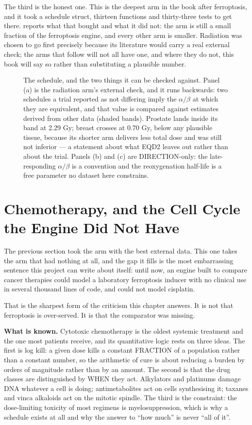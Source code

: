 \documentclass[11pt,twoside,openright]{report}
\begin{document}
The third is the honest one. This is the deepest arm in the book after ferroptosis, and it took a schedule struct, thirteen functions and thirty-three tests to get there.  reports what that bought and what it did not: the arm is still a small fraction of the ferroptosis engine, and every other arm is smaller. Radiation was chosen to go first precisely because its literature would carry a real external check; the arms that follow will not all have one, and where they do not, this book will say so rather than substituting a plausible number.

\begin{figure}[tbp]
\setcounter{figure}{31}
\caption{The schedule, and the two things it can be checked against. Panel (a) is the radiation arm's external check, and it runs backwards: two schedules a trial reported as not differing imply the $\alpha/\beta$ at which they are equivalent, and that value is compared against estimates derived from other data (shaded bands). Prostate lands inside its band at 2.29 Gy; breast crosses at 0.70 Gy, below any plausible tissue, because its shorter arm delivers less total dose and was still not inferior --- a statement about what EQD2 leaves out rather than about the trial. Panels (b) and (c) are DIRECTION-only: the late-responding $\alpha/\beta$ is a convention and the reoxygenation half-life is a free parameter no dataset here constrains.}
\label{fig:fig36_fractionation}
\end{figure}

\section{Chemotherapy, and the Cell Cycle the Engine Did Not Have}

The previous section took the arm with the best external data. This one takes the arm that had nothing at all, and the gap it fills is the most embarrassing sentence this project can write about itself: until now, an engine built to compare cancer therapies could model a laboratory ferroptosis inducer with no clinical use in several thousand lines of code, and could not model cisplatin.

That is the sharpest form of the criticism this chapter answers. It is not that ferroptosis is over-served. It is that the comparator was missing.

\textbf{What is known.} Cytotoxic chemotherapy is the oldest systemic treatment and the one most patients receive, and its quantitative logic rests on three ideas. The first is log kill: a given dose kills a constant FRACTION of a population rather than a constant number, so the arithmetic of cure is about reducing a burden by orders of magnitude rather than by an amount. The second is that the drug classes are distinguished by WHEN they act. Alkylators and platinums damage DNA whatever a cell is doing; antimetabolites act on cells synthesising it; taxanes and vinca alkaloids act on the mitotic spindle. The third is the constraint: the dose-limiting toxicity of most regimens is myelosuppression, which is why a schedule exists at all and why the answer to ``how much'' is never ``all of it''.
\end{document}
